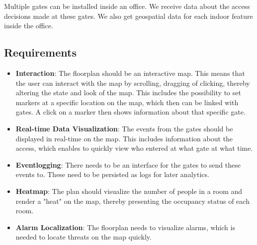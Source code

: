 Multiple gates can be installed inside an office. We receive data about the access decisions made at these gates. We also get geospatial data for each indoor feature inside the office.

\subsection{Requirements}

\begin{itemize}
    \item \textbf{Interaction}:
    The floorplan should be an interactive map. This means that the user can interact with the map by scrolling, dragging of clicking, thereby altering the state and look of the map. This includes the possibility to set markers at a specific location on the map, which then can be linked with gates. A click on a marker then shows information about that specific gate.
    \item \textbf{Real-time Data Visualization}:
     The events from the gates should be displayed in real-time on the map. This includes information about the access, which enables to quickly view who entered at what gate at what time.
    \item \textbf{Eventlogging}:
    There needs to be an interface for the gates to send these events to. These need to be persisted as logs for later analytics.
    \item \textbf{Heatmap}:
    The plan should visualize the number of people in a room and render a "heat" on the map, thereby presenting the occupancy status of each room.
    \item \textbf{Alarm Localization}:
    The floorplan needs to visualize alarms, which is needed to locate threats on the map quickly.
\end{itemize}

\clearpage



